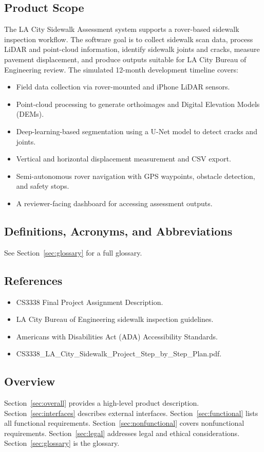 \documentclass{article}
\begin{document}
\subsection{Product Scope}
The LA City Sidewalk Assessment system supports a rover-based sidewalk inspection workflow. The
software goal is to collect sidewalk scan data, process LiDAR and point-cloud information, identify
sidewalk joints and cracks, measure pavement displacement, and produce outputs suitable for LA City
Bureau of Engineering review. The simulated 12-month development timeline covers:

\begin{itemize}
  \item Field data collection via rover-mounted and iPhone LiDAR sensors.
  \item Point-cloud processing to generate orthoimages and Digital Elevation Models (DEMs).
  \item Deep-learning-based segmentation using a U-Net model to detect cracks and joints.
  \item Vertical and horizontal displacement measurement and CSV export.
  \item Semi-autonomous rover navigation with GPS waypoints, obstacle detection, and safety stops.
  \item A reviewer-facing dashboard for accessing assessment outputs.
\end{itemize}

\subsection{Definitions, Acronyms, and Abbreviations}
See Section~\ref{sec:glossary} for a full glossary.

\subsection{References}
\begin{itemize}
  \item CS3338 Final Project Assignment Description.
  \item LA City Bureau of Engineering sidewalk inspection guidelines.
  \item Americans with Disabilities Act (ADA) Accessibility Standards.
  \item CS3338\_LA\_City\_Sidewalk\_Project\_Step\_by\_Step\_Plan.pdf.
\end{itemize}

\subsection{Overview}
Section~\ref{sec:overall} provides a high-level product description. Section~\ref{sec:interfaces}
describes external interfaces. Section~\ref{sec:functional} lists all functional requirements.
Section~\ref{sec:nonfunctional} covers nonfunctional requirements. Section~\ref{sec:legal} addresses
legal and ethical considerations. Section~\ref{sec:glossary} is the glossary.
\end{document}
